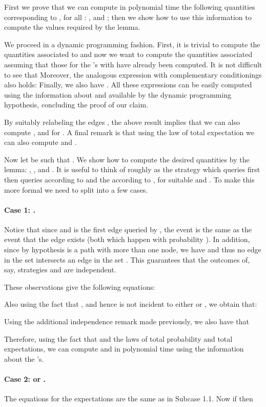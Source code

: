 \documentclass[12pt]{article}
\begin{document}
	First we prove that we can compute in polynomial time the following quantities corresponding to , for all : ,  and ; then we show how to use this information to compute the values required by the lemma. 
	
	We proceed in a dynamic programming fashion. First, it is trivial to compute the quantities associated to  and now we want to compute the quantities associated  assuming that those for the 's with  have already been computed. It is not difficult to see that  Moreover, the analogous expression with complementary conditionings also holds:  Finally, we also have . All these expressions can be easily computed using the information about  and  available by the dynamic programming hypothesis, concluding the proof of our claim. 
	
	By suitably relabeling the edges , the above result implies that we can also compute ,  and  for . A final remark is that using the law of total expectation we can also compute  and .
	
	Now let  be such that . We show how to compute the desired quantities by the lemma: , ,  and . It is useful to think of  roughly as the strategy which queries  first then queries according to  and the according to , for suitable  and .	To make this more formal we need to split into a few cases.
	
	\paragraph{Case 1: .} Notice that since  and  is the first edge queried by , the event  is the same as the event that the edge  exists (both which happen with probability ). In addition, since by hypothesis  is a path with more than one node, we have  and thus no edge in the set  intersects an edge in the set . This guarantees that the outcomes of, say, strategies  and  are independent. 
	
	These observations give the following equations:
	
	
	Also using the fact that , and hence  is not incident to either  or , we obtain that: 
	
	
	Using the additional independence remark made previously, we also have that 
		
	
	Therefore, using the fact that  and the laws of total probability and total expectations, we can compute  and  in polynomial time using the information about the 's. 
	
	\paragraph{Case 2:  or .} The equations for the expectations are the same as in Subcase 1.1. Now if  then 
\end{document}
